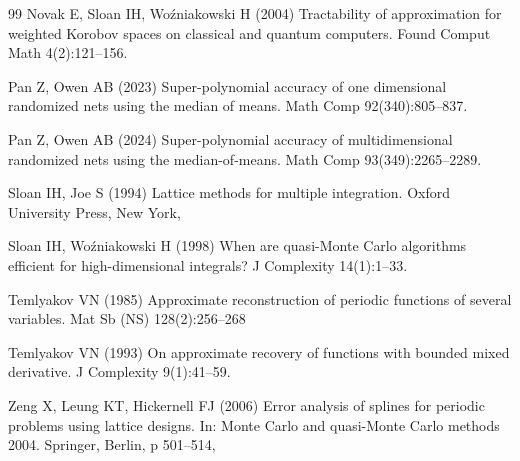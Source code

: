 \documentclass[pdflatex,sn-basic,Numbered]{sn-jnl}%
\theoremstyle{thmstyleone}%
\theoremstyle{thmstyletwo}%
\begin{document}
\begin{thebibliography}{99}
Novak E, Sloan IH, Wo\'zniakowski H (2004) Tractability of approximation for
  weighted {K}orobov spaces on classical and quantum computers. Found Comput
  Math 4(2):121--156. 

Pan Z, Owen AB (2023) Super-polynomial accuracy of one dimensional randomized
  nets using the median of means. Math Comp 92(340):805--837.

Pan Z, Owen AB (2024) Super-polynomial accuracy of multidimensional randomized
  nets using the median-of-means. Math Comp 93(349):2265--2289.

Sloan IH, Joe S (1994) Lattice methods for multiple integration. Oxford
  University Press, New York, 

Sloan IH, Wo\'zniakowski H (1998) When are quasi-{M}onte {C}arlo algorithms
  efficient for high-dimensional integrals? J Complexity 14(1):1--33.

Temlyakov VN (1985) Approximate reconstruction of periodic functions of several
  variables. Mat Sb (NS) 128(2):256--268

Temlyakov VN (1993) On approximate recovery of functions with bounded mixed
  derivative. J Complexity 9(1):41--59. 

Zeng X, Leung KT, Hickernell FJ (2006) Error analysis of splines for periodic
  problems using lattice designs. In: Monte {C}arlo and quasi-{M}onte {C}arlo
  methods 2004. Springer, Berlin, p 501--514, 
\end{thebibliography}


%
\end{document}
